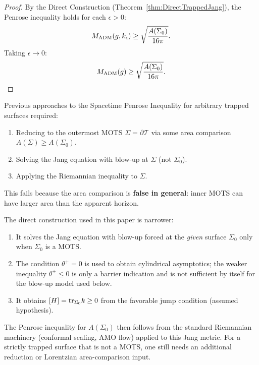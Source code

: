 \begin{proof}
By the Direct Construction (Theorem~\ref{thm:DirectTrappedJang}), the Penrose inequality holds for each $\epsilon > 0$:
\[
    M_{\mathrm{ADM}}(g, k_\epsilon) \ge \sqrt{\frac{A(\Sigma_0)}{16\pi}}.
\]
Taking $\epsilon \to 0$:
\[
    M_{\mathrm{ADM}}(g) \ge \sqrt{\frac{A(\Sigma_0)}{16\pi}}.
\]
\end{proof}

\begin{remark}\label{rem:WhyBypassAreaComparison}
Previous approaches to the Spacetime Penrose Inequality for arbitrary trapped surfaces required:
\begin{enumerate}
    \item Reducing to the outermost MOTS $\Sigma = \partial\mathcal{T}$ via some area comparison $A(\Sigma) \ge A(\Sigma_0)$.
    \item Solving the Jang equation with blow-up at $\Sigma$ (not $\Sigma_0$).
    \item Applying the Riemannian inequality to $\Sigma$.
\end{enumerate}
This fails because the area comparison is \textbf{false in general}: inner MOTS can have larger area than the apparent horizon.

The direct construction used in this paper is narrower:
\begin{enumerate}
    \item It solves the Jang equation with blow-up forced at the \emph{given} surface $\Sigma_0$ only when $\Sigma_0$ is a MOTS.
    \item The condition $\theta^+=0$ is used to obtain cylindrical asymptotics; the weaker inequality $\theta^+\le0$ is only a barrier indication and is not sufficient by itself for the blow-up model used below.
    \item It obtains $[H] = \mathrm{tr}_{\Sigma_0} k \ge 0$ from the favorable jump condition (assumed hypothesis).
\end{enumerate}
The Penrose inequality for $A(\Sigma_0)$ then follows from the standard Riemannian machinery (conformal sealing, AMO flow) applied to this Jang metric. For a strictly trapped surface that is not a MOTS, one still needs an additional reduction or Lorentzian area-comparison input.
\end{remark}

